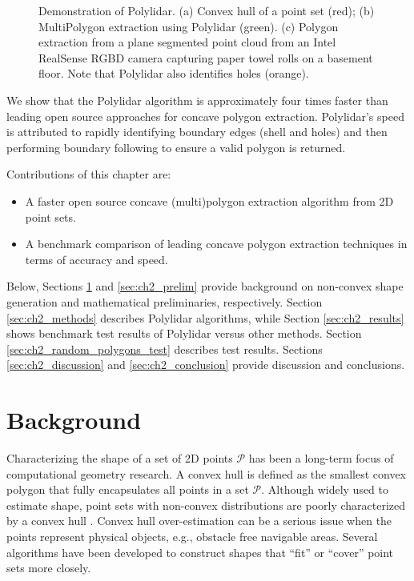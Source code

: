 \begin{figure}[t]
\begin{subfigure}{.25\linewidth}
    \caption{}
    \label{fig:ch2_realsense}
  \end{subfigure}
  \caption[Demonstration of Polylidar]{Demonstration of Polylidar. (a) Convex hull of a point set (red); (b) MultiPolygon extraction using Polylidar (green).
  (c) Polygon extraction from a plane segmented point cloud from an Intel RealSense RGBD camera capturing paper towel rolls on a basement floor. 
  Note that Polylidar also identifies holes (orange).}
  \label{fig:ch2_convex_concave} 
\end{figure}



We show that the Polylidar algorithm is approximately four times faster than leading open source approaches for concave polygon extraction. Polylidar's speed is attributed to rapidly identifying boundary edges (shell and holes) and then performing  boundary following to ensure a valid polygon is returned. 


Contributions of this chapter are:
\begin{itemize}
  \item A faster open source \cite{Castagno_Github_Polylidar} concave (multi)polygon extraction algorithm from 2D point sets.
  \item A benchmark comparison of leading concave polygon extraction techniques in terms of accuracy and speed.
\end{itemize}

Below, Sections \ref{sec:ch2_background} and \ref{sec:ch2_prelim} provide background on non-convex shape generation and mathematical preliminaries, respectively. Section \ref{sec:ch2_methods} describes Polylidar algorithms, while Section \ref{sec:ch2_results} shows benchmark test results of Polylidar versus other methods.  Section \ref{sec:ch2_random_polygons_test} describes test results. Sections  \ref{sec:ch2_discussion} and \ref{sec:ch2_conclusion} provide discussion and conclusions.



\section{Background}\label{sec:ch2_background}

Characterizing the shape of a set of 2D points $\mathcal{P}$ has been a long-term focus of computational geometry research. A convex hull is defined as the smallest convex polygon that fully encapsulates all points in a set $\mathcal{P}$.  Although widely used to estimate shape, point sets with non-convex distributions are poorly characterized by a convex hull \cite{duckham_efficient_2008}.  Convex hull over-estimation can be a serious issue when the points represent physical objects, e.g., obstacle free navigable areas. Several algorithms have been developed to construct shapes that ``fit'' or ``cover'' point sets more closely. 

